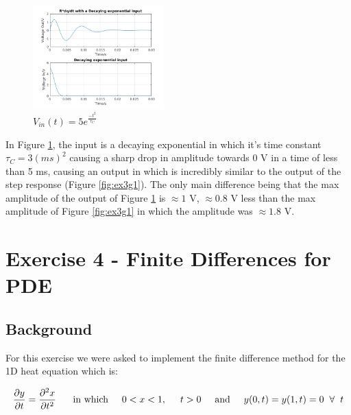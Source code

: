 \documentclass[11pt,a4paper]{article}
\begin{document}
\begin{figure}
    \vspace{-23mm}
  		\includegraphics[width=0.45\textwidth]{Ex3_Figs/DecExp.png}
	\vspace{-6mm}
  	\caption{$V_{in}(t)= 5e^{\frac{-t^2}{\tau_C}}$}
  	\label{fig:ex3g8}
\end{figure}

In Figure \ref{fig:ex3g8}, the input is a decaying exponential in which it's time constant $\tau_C = 3 (ms)^2$ causing a sharp drop in amplitude towards 0 V in a time of less than 5 ms, causing an output in which is incredibly similar to the output of the step response (Figure \ref{fig:ex3g1}). The only main difference being that the max amplitude of the output of Figure \ref{fig:ex3g8} is $\approx 1$ V, $\approx 0.8$ V less than the max amplitude of Figure \ref{fig:ex3g1} in which the amplitude was $\approx 1.8$ V.

\pagebreak

\section{Exercise 4 - Finite Differences for PDE}\vspace{-1mm}
\subsection{Background}

For this exercise we were asked to implement the finite difference method for the 1D heat equation which is:

\[\frac{\partial y}{\partial t} = \frac{\partial^2 x}{\partial t^2}\ \hspace{5mm} \text{in which} \hspace{5mm} 0 < x < 1, \hspace{5mm} t > 0 \hspace{5mm} \text{and} \hspace{5mm} y(0,t) = y(1,t) = 0 \hspace{2mm} \forall \hspace{2mm} t\]
\end{document}
